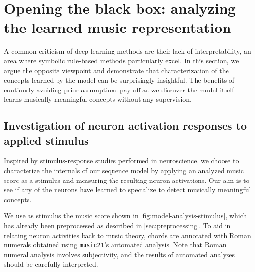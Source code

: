 \chapter{Opening the black box: analyzing the learned music representation}\label{ch:model-analysis}
\ifpdf
    \graphicspath{{Chapter5/Figs/Raster/}{Chapter5/Figs/PDF/}{Chapter5/Figs/}}
\else
    \graphicspath{{Chapter5/Figs/Vector/}{Chapter5/Figs/}}
\fi

A common criticism of deep learning methods are their lack of interpretability,
an area where symbolic rule-based methods particularly excel. In this section,
we argue the opposite viewpoint and demonstrate that characterization of the
concepts learned by the model can be surprisingly insightful. The benefits of
cautiously avoiding prior assumptions pay off as we discover the model itself learns
musically meaningful concepts without any supervision.

\section{Investigation of neuron activation responses to applied stimulus}

Inspired by stimulus-response studies performed in neuroscience, we choose to
characterize the internals of our sequence model by applying an analyzed music
score as a stimulus and measuring the resulting neuron activations. Our aim
is to see if any of the neurons have learned to specialize to detect musically meaningful
concepts.

We use as stimulus the music score shown in \cref{fig:model-analysis-stimulus},
which has already been preprocessed as described in \vref{sec:preprocessing}.
To aid in relating neuron activities back to music theory, chords are annotated
with Roman numerals obtained using {\tt music21}'s automated analysis. Note
that Roman numeral analysis involves subjectivity, and the results of automated
analyses should be carefully interpreted.

